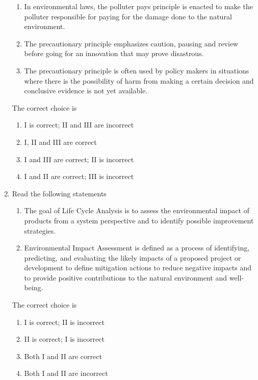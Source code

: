 \documentclass[journal,12pt,onecolumn]{IEEEtran}
\theoremstyle{remark}
\begin{document}
\begin{enumerate}
\begin{enumerate}[label=\Roman*.]
\item In environmental laws, the polluter pays principle is enacted to make the polluter responsible for paying for the damage done to the natural environment.
\item The precautionary principle emphasizes caution, pausing and review before going for an innovation that may prove disastrous.
\item The precautionary principle is often used by policy makers in situations where there is the possibility of harm from making a certain decision and conclusive evidence is not yet available.
\end{enumerate}

The correct choice is

\begin{enumerate}
\item I is correct; II and III are incorrect
\item I, II and III are correct
\item I and III are correct; II is incorrect
\item I and II are correct; III is incorrect
\end{enumerate}
\hfill{}
\item Read the following statements

\begin{enumerate}[label=\Roman*.]
\item The goal of Life Cycle Analysis  is to assess the environmental impact of products from a system perspective and to identify possible improvement strategies.
\item Environmental Impact Assessment  is defined as a process of identifying, predicting, and evaluating the likely impacts of a proposed project or development to define mitigation actions to reduce negative impacts and to provide positive contributions to the natural environment and well-being.
\end{enumerate}

The correct choice is

\begin{enumerate}
\item I is correct; II is incorrect
\item II is correct; I is incorrect
\item Both I and II are correct
\item Both I and II are incorrect
\end{enumerate}
\hfill{}


\end{enumerate}
\end{document}
